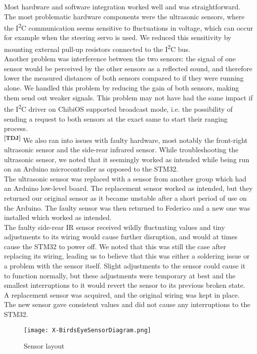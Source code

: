 \noindent
Most hardware and software integration worked well and was straightforward. The
most problematic hardware components were the ultrasonic sensors, where the
I\textsuperscript{2}C communication seems sensitive to fluctuations in voltage,
which can occur for example when the steering servo is used. We reduced this
sensitivity by mounting external pull-up resistors connected to the
I\textsuperscript{2}C bus.\\

\noindent
Another problem was interference between the two sensors: the signal of one
sensor would be perceived by the other sensors as a reflected sound, and
therefore lower the measured distances of both sensors compared to if they were
running alone. We handled this problem by reducing the gain of both sensors,
making them send out weaker signals. This problem may not have had the same
impact if the I\textsuperscript{2}C driver on ChibiOS supported broadcast mode,
i.e. the possibility of sending a request to both sensors at the exact same to
start their ranging process.\\

\noindent
\textsuperscript{\textbf{[TDJ]}}
We also ran into issues with faulty hardware, most notably the front-right
ultrasonic sensor and the side-rear infrared sensor. While troubleshooting the
ultrasonic sensor, we noted that it seemingly worked as intended while being run
on an Arduino microcontroller as opposed to the STM32.\\

\noindent
The ultrasonic sensor was replaced with a sensor from another group which had an
Arduino low-level board. The replacement sensor worked as intended, but they
returned our original sensor as it became unstable after a short period of use
on the Arduino. The faulty sensor was then returned to Federico and a new one
was installed which worked as intended.\\

\noindent
The faulty side-rear IR sensor received wildly fluctuating values and tiny
adjustments to its wiring would cause further disruption, and would at times
cause the STM32 to power off. We noted that this was still the case after
replacing its wiring, leading us to believe that this was either a soldering
issue or a problem with the sensor itself. Slight adjustments to the sensor
could cause it to function normally, but these adjustments were temporary at
best and the smallest interruptions to it would revert the sensor to its
previous broken state.\\

\noindent
A replacement sensor was acquired, and the original wiring was kept in place.
The new sensor gave consistent values and did not cause any interruptions to the
STM32.
\begin{figure}[ht]
  \centering
  \texttt{[image: X-BirdsEyeSensorDiagram.png]}
  \caption{Sensor layout}
  \label{sensorlay}
\end{figure}

